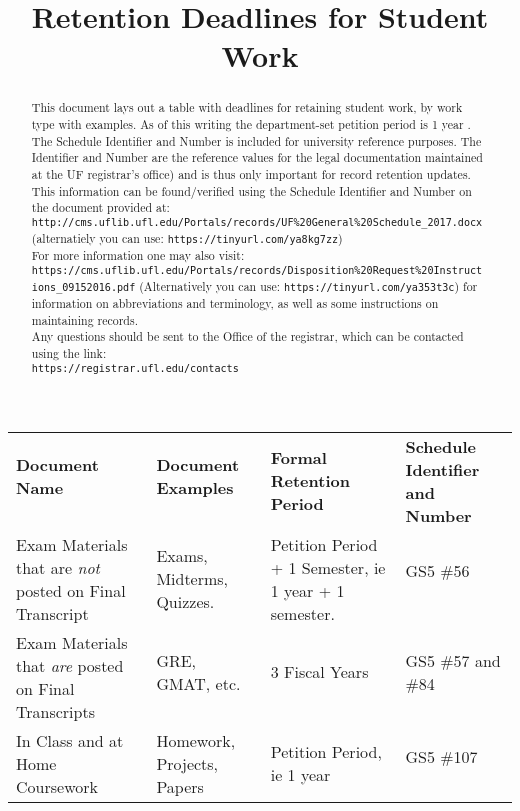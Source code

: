 \documentclass{article}
\date{}
\title{Retention Deadlines for Student Work}
\newcommand{\petitionPeriod}{%
    1 year
    }
\begin{document}
\maketitle
\begin{abstract}
    This document lays out a table with deadlines for retaining student work, by work type with examples. As of this writing the department-set petition period is \petitionPeriod. The Schedule Identifier and Number is included for university reference purposes. The Identifier and Number are the reference values for the legal documentation maintained at the UF registrar's office) and is thus only important for record retention updates.\\
    
    This information can be found/verified using the Schedule Identifier and Number on the document provided at:\\ \verb|http://cms.uflib.ufl.edu/Portals/records/UF%20General%20Schedule_2017.docx| \\ (alternatiely you can use:
    \verb|https://tinyurl.com/ya8kg7zz|)\\
    
    For more information one may also visit:\\
    \verb|https://cms.uflib.ufl.edu/Portals/records/Disposition%20Request%20Instructions_09152016.pdf| (Alternatively you can use: \verb|https://tinyurl.com/ya353t3c|) for information on abbreviations and terminology, as well as some instructions on maintaining records.\\
    
    Any questions should be sent to the Office of the registrar, which can be contacted using the link: \\
    \verb|https://registrar.ufl.edu/contacts|
     
\end{abstract}
\renewcommand{\arraystretch}{1.4}
\vfill
\begin{tabular}{llll}
    \textbf{Document Name} & \textbf{Document Examples} & \multirow{2}{3.5cm}{\centering\textbf{Formal Retention Period}} & \multirow{2}{3.5cm}{\centering\textbf{Schedule Identifier and Number}} \\ \\ \hline
    \multirow{2}{4.5cm}{Exam Materials that are \textit{not} posted on Final Transcript}
        & \multirow{2}{3cm}{\centering Exams, Midterms, Quizzes.}
        & \multirow{2}{5cm}{Petition Period + 1 Semester, ie \petitionPeriod + 1 semester.}
        & GS5 \#56\\ \\ \hline
    \multirow{2}{4.5cm}{Exam Materials that \textit{are} posted on Final Transcripts}
        & GRE, GMAT, etc.
        & 3 Fiscal Years
        & GS5 \#57 and \#84\\ \\ \hline
    \multirow{2}{4.5cm}{In Class and at Home Coursework}
        & \multirow{2}{3cm}{\centering Homework, Projects, Papers}
        & \multirow{2}{5cm}{Petition Period, ie \petitionPeriod}
        & GS5 \#107\\ \\ \hline
\end{tabular}
\vfill\vfill
\end{document}
